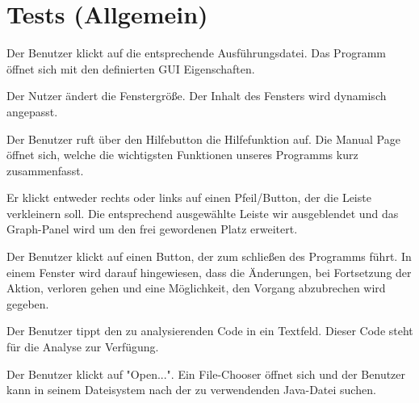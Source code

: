 \section{Tests (Allgemein)}

\tests{}

{Der Benutzer klickt auf die entsprechende Ausführungsdatei.}
{Das Programm öffnet sich mit den definierten GUI Eigenschaften.}

{Der Nutzer ändert die Fenstergröße.}
{Der Inhalt des Fensters wird dynamisch angepasst.}

{Der Benutzer ruft über den Hilfebutton die Hilfefunktion auf.}
{Die Manual Page öffnet sich, welche die wichtigsten Funktionen unseres Programms kurz zusammenfasst.}

{Er klickt entweder rechts oder links auf einen Pfeil/Button, der die Leiste verkleinern soll.}
{Die entsprechend ausgewählte Leiste wir ausgeblendet und das Graph-Panel wird um den frei gewordenen Platz erweitert.}

{Der Benutzer klickt auf einen Button, der zum schließen des Programms führt.}
{In einem Fenster wird darauf hingewiesen, dass die Änderungen, bei Fortsetzung der Aktion, verloren gehen und eine Möglichkeit, den Vorgang abzubrechen wird gegeben.}

\tests{}

{Der Benutzer tippt den zu analysierenden Code in ein Textfeld.}
{Dieser Code steht für die Analyse zur Verfügung.}

{Der Benutzer klickt auf "Open...".}
{Ein File-Chooser öffnet sich und der Benutzer kann in seinem Dateisystem nach der zu verwendenden Java-Datei suchen.}

